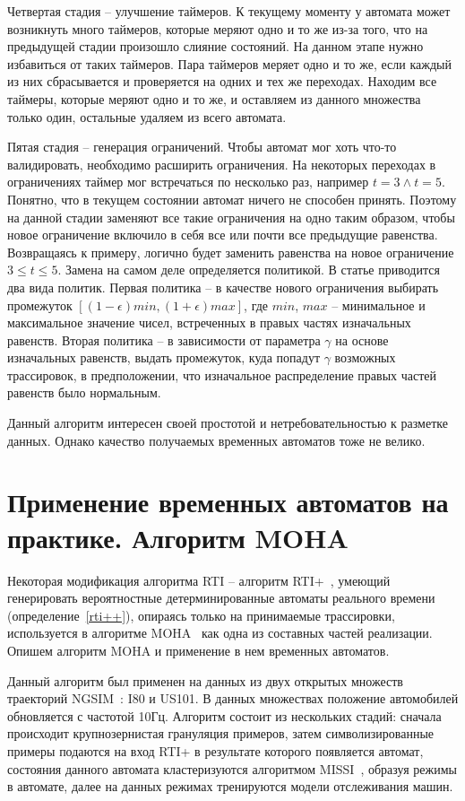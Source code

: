 \documentclass[times,specification,annotation]{itmo-student-thesis}
\begin{document}
Четвертая стадия -- улучшение таймеров. К текущему моменту у автомата может возникнуть много таймеров, которые меряют одно и то же из-за того, что на предыдущей стадии произошло слияние состояний.
На данном этапе нужно избавиться от таких таймеров. Пара таймеров меряет одно и то же, если каждый из них сбрасывается и проверяется на одних и тех же переходах. Находим все таймеры, которые меряют
одно и то же, и оставляем из данного множества только один, остальные удаляем из всего автомата.

Пятая стадия -- генерация ограничений. Чтобы автомат мог хоть что-то валидировать, необходимо расширить ограничения. На некоторых переходах в ограничениях таймер мог встречаться по несколько раз, 
например $t = 3 \land t = 5$. Понятно, что в текущем состоянии автомат ничего не способен принять. Поэтому на данной стадии заменяют все такие ограничения на одно таким образом, чтобы новое ограничение
включило в себя все или почти все предыдущие равенства. Возвращаясь к примеру, логично будет заменить равенства на новое ограничение $3 \leq t \leq 5$. Замена на самом деле определяется политикой.
В статье приводится два вида политик. Первая политика -- в качестве нового ограничения выбирать промежуток $[(1-\epsilon)min, (1+\epsilon)max]$, где $min$, $max$ -- минимальное
и максимальное значение чисел, встреченных в правых частях изначальных равенств. Вторая политика -- в зависимости от параметра $\gamma$
на основе изначальных равенств, выдать промежуток, куда попадут $\gamma$ возможных трассировок, в предположении, что изначальное распределение правых частей равенств было нормальным.

Данный алгоритм интересен своей простотой и нетребовательностью к разметке данных. Однако качество получаемых временных автоматов тоже не велико.

\section{Применение временных автоматов на практике. Алгоритм MOHA}

Некоторая модификация алгоритма RTI -- алгоритм RTI+~\cite{rti-plus}, умеющий генерировать вероятностные детерминированные автоматы реального времени (определение~\ref{rti++}),
опираясь только на принимаемые трассировки, используется в алгоритме MOHA~\cite{moha} как одна из составных частей реализации. Опишем алгоритм MOHA и применение в нем временных автоматов.

Данный алгоритм был применен на данных из двух открытых множеств траекторий NGSIM~\cite{ngsim}: I80 и US101. В данных множествах положение автомобилей обновляется с частотой 10Гц.
Алгоритм состоит из нескольких стадий: сначала происходит крупнозернистая грануляция примеров, затем символизированные примеры подаются на вход RTI+ в результате которого
появляется автомат, состояния данного автомата кластеризуются алгоритмом MISSI~\cite{moha}, образуя режимы в автомате, далее на данных режимах тренируются модели отслеживания
машин.
\end{document}
